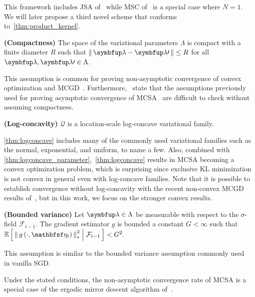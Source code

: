 This framework includes JSA of~\citet{pmlr-v124-ou20a} while MSC of~\citet{pmlr-v124-ou20a} is a special case where \(N=1\).
We will later propose a third novel scheme that conforms to~\cref{thm:product_kernel}.

\begin{assumption}{\textbf{(Compactness)}}\label{thm:compact}
  The space of the variational parameters \(\Lambda\) is compact with a finite diameter \(R\) such that \(\norm{\vlambda - \vlambda\prime} \leq R \) for all \(\vlambda, \vlambda\prime \in \Lambda\).
\end{assumption}
This assumption is common for proving non-asymptotic convergence of convex optimization and MCGD~\citep{duchi_ergodic_2012, NEURIPS2018_1371bcce, doan_convergence_2020}.
Furthermore,~\citeauthor{NEURIPS2020_b2070693} state that the assumptions previously used for proving asymptotic convergence of MCSA~\citep{NEURIPS2020_b2070693} are difficult to check without assuming compactness.

\begin{assumption}{\textbf{(Log-concavity)}}\label{thm:logconcave}
  \(\mathcal{Q}\) is a location-scale log-concave variational family.
\end{assumption}
%

%
\cref{thm:logconcave} includes many of the commonly used variational families such as the normal, exponential, and uniform, to name a few.
Also, combined with \cref{thm:logconcave_parameter},~\cref{thm:logconcave} results in MCSA becoming a convex optimization problem, which is surprising since exclusive KL minimization is not convex in general even with log-concave families.
Note that it is possible to establish convergence without log-concavity with the recent non-convex MCGD results of~\citet{NEURIPS2018_1371bcce, pmlr-v99-karimi19a, doan_convergence_2020}, but in this work, we focus on the stronger convex results.

\begin{assumption}{\textbf{(Bounded variance)}}\label{thm:bounded_variance}
  Let \(\vlambda \in \Lambda\) be measurable with respect to the \(\sigma\)-field \(\mathcal{F}_{t-1}\).
  The  gradient estimator \(g\) is bounded a constant \(G < \infty\) such that
  \(
  \E{ {\lVert\, g\left(\cdot, \rvveta_{t}\right) \,\rVert}^2_{*} \;\middle|\; \mathcal{F}_{t-1}} < G^2.
  \)
\end{assumption}
This assumption is similar to the bounded variance assumption commonly used in vanilla SGD.

Under the stated conditions, the non-asymptotic convergence rate of MCSA is a special case of the ergodic mirror descent algorithm of~\citet{duchi_ergodic_2012}.

